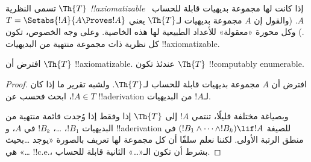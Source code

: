 \documentclass[../../../include/open-logic-section]{subfiles}
\begin{document}


تسمى النظرية $\Th{T}$ \emph{!!{axiomatizable}} إذا كانت لها مجموعة
بديهيات قابلة للحساب~$A$. (والقول إن $A$ مجموعة بديهيات لـ$\Th{T}$
يعني $T=\Setabs{!A}{A\Proves !A}$.) وكل محورة «معقولة» للأعداد
الطبيعية لها هذه الخاصية. وعلى وجه الخصوص، تكون كل نظرية ذات مجموعة
منتهية من البديهيات !!{axiomatizable}.

\begin{lem}
افترض أن $\Th{T}$ !!{axiomatizable}. عندئذ تكون $\Th{T}$
!!{computably
enumerable}.
\end{lem}

\begin{proof}
افترض أن $A$ مجموعة بديهيات قابلة للحساب لـ$\Th{T}$. ولشبه تقرير ما
إذا كان $!A\in T$، ابحث فحسب عن !!a{derivation} لـ$!A$ من البديهيات.

وبصياغة مختلفة قليلًا، تنتمي $!A$ إلى $\Th{T}$ إذا وفقط إذا وُجدت
قائمة منتهية من البديهيات $!B_1$، \dots، $!B_k$ في $A$، و
!!a{derivation} للصيغة
$(!B_1\land\dots\land !B_k)\lif !A$ في منطق الرتبة الأولى. لكننا
نعلم سلفًا أن كل مجموعة لها تعريف بالصورة «يوجد \dots بحيث \dots»
هي !!{c.e.}، بشرط أن تكون الـ«\dots» الثانية قابلة للحساب.
\end{proof}
\end{document}

